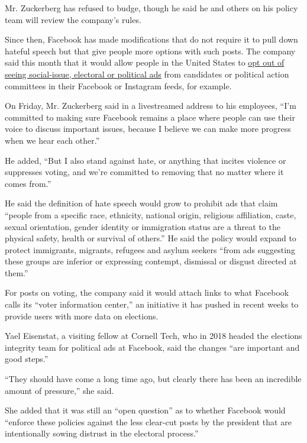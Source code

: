 Mr. Zuckerberg has refused to budge, though he said he and others on his
policy team will review the company's rules.

Since then, Facebook has made modifications that do not require it to
pull down hateful speech but that give people more options with such
posts. The company said this month that it would allow people in the
United States to
\href{https://www.nytimes3xbfgragh.onion/2020/06/16/technology/opt-out-political-ads-facebook.html}{opt
out of seeing social-issue, electoral or political ads} from candidates
or political action committees in their Facebook or Instagram feeds, for
example.

On Friday, Mr. Zuckerberg said in a livestreamed address to his
employees, ``I'm committed to making sure Facebook remains a place where
people can use their voice to discuss important issues, because I
believe we can make more progress when we hear each other.''

He added, ``But I also stand against hate, or anything that incites
violence or suppresses voting, and we're committed to removing that no
matter where it comes from.''

He said the definition of hate speech would grow to prohibit ads that
claim ``people from a specific race, ethnicity, national origin,
religious affiliation, caste, sexual orientation, gender identity or
immigration status are a threat to the physical safety, health or
survival of others.'' He said the policy would expand to protect
immigrants, migrants, refugees and asylum seekers ``from ads suggesting
these groups are inferior or expressing contempt, dismissal or disgust
directed at them.''

For posts on voting, the company said it would attach links to what
Facebook calls its ``voter information center,'' an initiative it has
pushed in recent weeks to provide users with more data on elections.

Yael Eisenstat, a visiting fellow at Cornell Tech, who in 2018 headed
the elections integrity team for political ads at Facebook, said the
changes ``are important and good steps.''

``They should have come a long time ago, but clearly there has been an
incredible amount of pressure,'' she said.

She added that it was still an ``open question'' as to whether Facebook
would ``enforce these policies against the less clear-cut posts by the
president that are intentionally sowing distrust in the electoral
process.''

